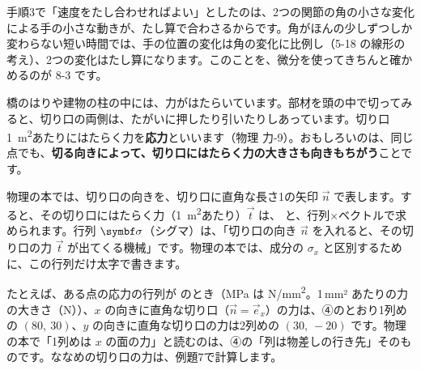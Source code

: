 \begin{seikaku}
手順3で「速度をたし合わせればよい」としたのは、2つの関節の角の小さな変化による手の小さな動きが、たし算で合わさるからです。角がほんの少しずつしか変わらない短い時間では、手の位置の変化は角の変化に比例し（5-18 の線形の考え）、2つの変化はたし算になります。このことを、微分を使ってきちんと確かめるのが 8-3 です。
\end{seikaku}

\label{bk:7-2:ouryoku}

橋のはりや建物の柱の中には、力がはたらいています。部材を頭の中で切ってみると、切り口の両側は、たがいに押したり引いたりしあっています。切り口\qty{1}{m^2}あたりにはたらく力を\textbf{応力}といいます（物理 力-9）。おもしろいのは、同じ点でも、\textbf{切る向きによって、切り口にはたらく力の大きさも向きもちがう}ことです。

\noindent\begin{minipage}[c]{0.5\linewidth}
\raggedright
物理の本では、切り口の向きを、切り口に直角な長さ1の矢印 $\vec n$ で表します。すると、その切り口にはたらく力（\qty{1}{m^2}あたり）$\vec t$ は、
と、行列×ベクトルで求められます。行列 $\kviicsig$（シグマ）は、「切り口の向き $\vec n$ を入れると、その切り口の力 $\vec t$ が出てくる機械」です。物理の本では、成分の $\sigma_x$ と区別するために、この行列だけ太字で書きます。
\end{minipage}\hfill
\begin{minipage}[c]{0.46\linewidth}
\centering
{}
\end{minipage}

\vspace{4pt}
たとえば、ある点の応力の行列が
のとき（MPa は \unit{N/mm^2}。1\,mm² あたりの力の大きさ（N））、$x$ の向きに直角な切り口（$\vec n=\vec e_x$）の力は、④のとおり1列めの $(80,\ 30)$、$y$ の向きに直角な切り口の力は2列めの $(30,\ -20)$ です。物理の本で「1列めは $x$ の面の力」と読むのは、④の「列は物差しの行き先」そのものです。ななめの切り口の力は、例題7で計算します。

